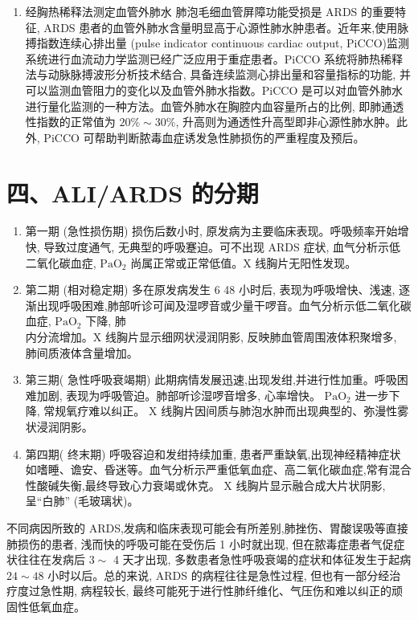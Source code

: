 \documentclass[10pt]{article}
\begin{document}
\begin{enumerate}
  \item 经胸热稀释法测定血管外肺水 肺泡毛细血管屏障功能受损是 ARDS 的重要特征, ARDS 患者的血管外肺水含量明显高于心源性肺水肿患者。近年来,使用脉搏指数连续心排出量 (pulse indicator continuous cardiac output, PiCCO)监测系统进行血流动力学监测已经广泛应用于重症患者。PiCCO 系统将肺热稀释法与动脉脉搏波形分析技术结合, 具备连续监测心排出量和容量指标的功能, 并可以监测血管阻力的变化以及血管外肺水指数。PiCCO 是可以对血管外肺水进行量化监测的一种方法。血管外肺水在胸腔内血容量所占的比例, 即肺通透性指数的正常值为 $20 \% \sim 30 \%$, 升高则为通透性升高型即非心源性肺水肿。此外, PiCCO 可帮助判断脓毒血症诱发急性肺损伤的严重程度及预后。

\end{enumerate}

\section*{四、ALI/ARDS 的分期}
\begin{enumerate}
  \item 第一期 (急性损伤期) 损伤后数小时, 原发病为主要临床表现。呼吸频率开始增快, 导致过度通气, 无典型的呼吸蹇迫。可不出现 ARDS 症状, 血气分析示低二氧化碳血症, $\mathrm{PaO}_{2}$ 尚属正常或正常低值。X 线胸片无阳性发现。

  \item 第二期 (相对稳定期) 多在原发病发生 6 48 小时后, 表现为呼吸增快、浅速, 逐渐出现呼吸困难,肺部听诊可闻及湿啰音或少量干啰音。血气分析示低二氧化碳血症, $\mathrm{PaO}_{2}$ 下降, 肺\\
内分流增加。X 线胸片显示细网状浸润阴影, 反映肺血管周围液体积聚增多, 肺间质液体含量增加。

  \item 第三期( 急性呼吸衰竭期) 此期病情发展迅速,出现发绀,并进行性加重。呼吸困难加剧, 表现为呼吸管迫。肺部听诊湿啰音增多, 心率增快。 $\mathrm{PaO}_{2}$ 进一步下降, 常规氧疗难以纠正。 $\mathrm{X}$ 线胸片因间质与肺泡水肿而出现典型的、弥漫性雾状浸润阴影。

  \item 第四期( 终末期) 呼吸容迫和发绀持续加重, 患者严重缺氧,出现神经精神症状如嗜睡、谵安、昏迷等。血气分析示严重低氧血症、高二氧化碳血症,常有混合性酸碱失衡,最终导致心力衰竭或休克。 $\mathrm{X}$ 线胸片显示融合成大片状阴影,呈“白肺” (毛玻璃状)。

\end{enumerate}

不同病因所致的 ARDS,发病和临床表现可能会有所差别,肺挫伤、胃酸误吸等直接肺损伤的患者, 浅而快的呼吸可能在受伤后 1 小时就出现, 但在脓毒症患者气促症状往往在发病后 $3 \sim$ 4 天才出现, 多数患者急性呼吸衰竭的症状和体征发生于起病 $24 \sim 48$ 小时以后。总的来说, ARDS 的病程往往是急性过程, 但也有一部分经治疗度过急性期, 病程较长, 最终可能死于进行性肺纤维化、气压伤和难以纠正的顽固性低氧血症。
\end{document}
